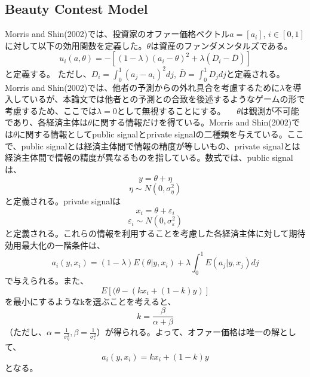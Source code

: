 \documentclass{jsarticle}
\begin{document}
\subsection{Beauty Contest Model}
Morris and Shin(2002)では、投資家のオファー価格ベクトル$a=[a_{i}]$, $i\in[0,1]$に対して以下の効用関数を定義した。$\theta$は資産のファンダメンタルズである。
$$ u_{i}(a, \theta) = -[(1-\lambda)(a_{i} - \theta)^{2} + \lambda(D_{i} - \bar{D})] $$と定義する。
ただし、$D_{i} = \int^{1}_{0}(a_{j} - a_{i})^2dj$, $\bar{D} = \int^{1}_{0}D_{j}dj$と定義される。\\
Morris and Shin(2002)では、他者の予測からの外れ具合を考慮するために$\lambda$を導入しているが、本論文では他者との予測との合致を後述するようなゲームの形で考慮するため、ここでは$\lambda = 0$として無視することにする。
　$\theta$は観測が不可能であり、各経済主体は$\theta$に関する情報だけを得ている。Morris and Shin(2002)では$\theta$に関する情報としてpublic signalとprivate signalの二種類を与えている。ここで、public signalとは経済主体間で情報の精度が等しいもの、private signalとは経済主体間で情報の精度が異なるものを指している。数式では、public signalは、
\begin{equation}
 y = \theta + \eta 
\end{equation}
$$ \eta \sim N(0, \sigma^{2}_{\eta}) $$
と定義される。private signalは
$$ x_{i} = \theta + \varepsilon_{i} $$
$$ \varepsilon_{i} \sim N(0, \sigma^{2}_{\varepsilon}) $$
と定義される。これらの情報を利用することを考慮した各経済主体に対して期待効用最大化の一階条件は、
$$ a_{i}(y, x_{i}) = (1-\lambda)E(\theta|y, x_{i}) + \lambda \int^{1}_{0}E(a_{j}|y, x_{j})dj $$
で与えられる。また、
$$ E[(\theta - (kx_{i} + (1-k)y)]$$
を最小にするようなkを選ぶことを考えると、
$$k = \frac{\beta}{\alpha + \beta}$$
（ただし、$ \alpha = \frac{1}{\sigma^{2}_{\eta}}, \beta = \frac{1}{\sigma^{2}_{\varepsilon}} $）が得られる。よって、オファー価格は唯一の解として、
$$ a_{i}(y, x_{i}) = kx_{i} + (1-k)y $$
となる。
\end{document}
